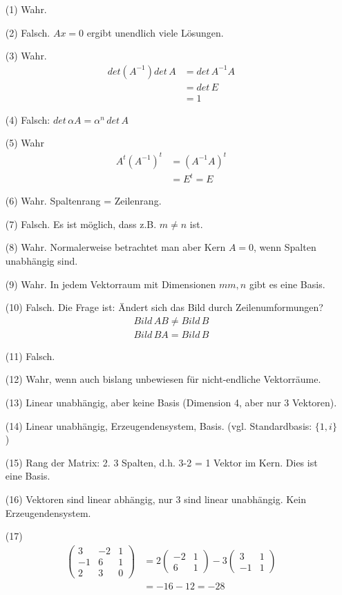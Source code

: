 \documentclass[11pt]{report}
\begin{document}
\begin{itemize}
\item[(1)] Wahr.
\item[(2)] Falsch. $Ax = 0$ ergibt unendlich viele Lösungen.
\item[(3)] Wahr. 
\begin{align}
det(A^{-1}) det\,A &= det\,A^{-1} A \\
&= det\,E \\
&= 1
\end{align}

\item[(4)] Falsch: $det\,\alpha A = \alpha^n\,det\,A$
\item[(5)] Wahr
\begin{align}
A^t (A^{-1})^t &= (A^{-1} A)^t \\
&= E^t = E
\end{align}
\item[(6)] Wahr. Spaltenrang = Zeilenrang.
\item[(7)] Falsch. Es ist möglich, dass z.B. $m \neq n$ ist.
\item[(8)] Wahr. Normalerweise betrachtet man aber Kern $A = 0$, wenn Spalten unabhängig sind.
\item[(9)] Wahr. In jedem Vektorraum mit Dimensionen $mm,n$ gibt es eine Basis.
\item[(10)] Falsch. Die Frage ist: Ändert sich das Bild durch Zeilenumformungen?
\begin{align}
Bild\,AB \neq Bild\,B \\
Bild\,BA = Bild\,B
\end{align}

\item[(11)] Falsch.
\item[(12)] Wahr, wenn auch bislang unbewiesen für nicht-endliche Vektorräume.
\item[(13)] Linear unabhängig, aber keine Basis (Dimension 4, aber nur 3 Vektoren). 
\item[(14)] Linear unabhängig, Erzeugendensystem, Basis. (vgl. Standardbasis: $\{1, i\}$)
\item[(15)] Rang der Matrix: 2. 3 Spalten, d.h. 3-2 = 1 Vektor im Kern. Dies ist eine Basis.
\item[(16)] Vektoren sind linear abhängig, nur 3 sind linear unabhängig. Kein Erzeugendensystem.
\item[(17)] 
\begin{align}
\begin{pmatrix} 3 & -2 & 1 \\ -1 & 6 & 1 \\ 2 & 3 & 0 \end{pmatrix} &= 2 \begin{pmatrix} -2 & 1 \\ 6 & 1\end{pmatrix} - 3 \begin{pmatrix} 3 & 1 \\ -1 & 1 \end{pmatrix} \\
&= -16 -12 = -28
\end{align}


\end{itemize}
\end{document}
